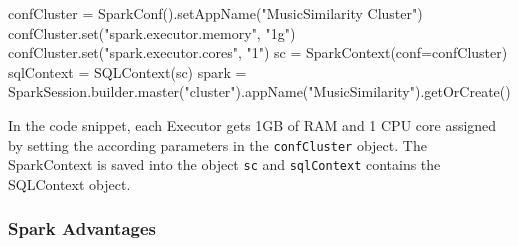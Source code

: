 \begin{pythonCode}[frame=single,label={lst:cconf},caption={Example cluster configuration Python},captionpos=b]
confCluster = SparkConf().setAppName("MusicSimilarity Cluster")
confCluster.set("spark.executor.memory", "1g")
confCluster.set("spark.executor.cores", "1")
sc = SparkContext(conf=confCluster)
sqlContext = SQLContext(sc)
spark = SparkSession.builder.master("cluster").appName("MusicSimilarity").getOrCreate()
\end{pythonCode}

\noindent In the code snippet, each Executor gets 1GB of RAM and 1 CPU core assigned by setting the according parameters in the \lstinline{confCluster} object. The SparkContext is saved into the object \lstinline{sc} and \lstinline{sqlContext} contains the SQLContext object.

\subsubsection{Spark Advantages}

